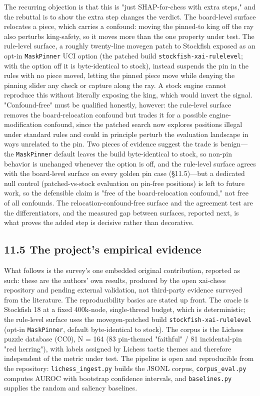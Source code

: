 \documentclass[conference]{IEEEtran}
\begin{document}
The recurring objection is that this is "just SHAP-for-chess with extra steps," and the rebuttal is to show the extra step changes the verdict. The board-level surface relocates a piece, which carries a confound: moving the pinned-to king off the ray also perturbs king-safety, so it moves more than the one property under test. The rule-level surface, a roughly twenty-line movegen patch to Stockfish exposed as an opt-in \texttt{MaskPinner} UCI option (the patched build \texttt{stockfish-xai-rulelevel}; with the option off it is byte-identical to stock), instead suspends the pin in the rules with no piece moved, letting the pinned piece move while denying the pinning slider any check or capture along the ray. A stock engine cannot reproduce this without literally exposing the king, which would invert the signal. "Confound-free" must be qualified honestly, however: the rule-level surface removes the board-relocation confound but trades it for a possible engine-modification confound, since the patched search now explores positions illegal under standard rules and could in principle perturb the evaluation landscape in ways unrelated to the pin. Two pieces of evidence suggest the trade is benign---the \texttt{MaskPinner} default leaves the build byte-identical to stock, so non-pin behavior is unchanged whenever the option is off, and the rule-level surface agrees with the board-level surface on every golden pin case (\S{}11.5)---but a dedicated null control (patched-vs-stock evaluation on pin-free positions) is left to future work, so the defensible claim is "free of the board-relocation confound," not free of all confounds. The relocation-confound-free surface and the agreement test are the differentiators, and the measured gap between surfaces, reported next, is what proves the added step is decisive rather than decorative.

\subsection*{11.5 The project's empirical evidence}
What follows is the survey's one embedded original contribution, reported as such: these are the authors' own results, produced by the open xai-chess repository and pending external validation, not third-party evidence surveyed from the literature. The reproducibility basics are stated up front. The oracle is Stockfish 18 at a fixed 400k-node, single-thread budget, which is deterministic; the rule-level surface uses the movegen-patched build \texttt{stockfish-xai-rulelevel} (opt-in \texttt{MaskPinner}, default byte-identical to stock). The corpus is the Lichess puzzle database (CC0), N = 164 (83 pin-themed "faithful" / 81 incidental-pin "red herring"), with labels assigned by Lichess tactic themes and therefore independent of the metric under test. The pipeline is open and reproducible from the repository: \texttt{lichess\_ingest.py} builds the JSONL corpus, \texttt{corpus\_eval.py} computes AUROC with bootstrap confidence intervals, and \texttt{baselines.py} supplies the random and saliency baselines.
\end{document}
